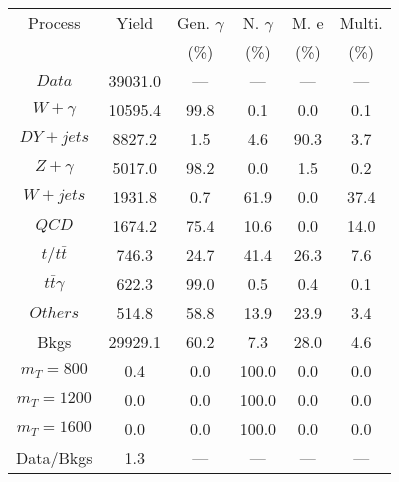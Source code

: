 \begin{figure}
\begin{minipage}[c]{0.32\textwidth}
{\begin{tabular}{cccccc}
\hline
Process & Yield & Gen. $\gamma$ & N. $\gamma$ & M. e & Multi. \\
 &  & (\%) & (\%) & (\%) & (\%)  \\
\hline
                                                                      $ Data $ &  39031.0 &  --- &  --- &  --- &  ---\\
$ W+\gamma $ &  10595.4 &  99.8 &  0.1 &  0.0 &  0.1\\
$ DY+jets $ &  8827.2 &  1.5 &  4.6 &  90.3 &  3.7\\
$ Z+\gamma $ &  5017.0 &  98.2 &  0.0 &  1.5 &  0.2\\
$ W+jets $ &  1931.8 &  0.7 &  61.9 &  0.0 &  37.4\\
$ QCD $ &  1674.2 &  75.4 &  10.6 &  0.0 &  14.0\\
$ t/t\bar{t} $ &  746.3 &  24.7 &  41.4 &  26.3 &  7.6\\
$ t\bar{t}\gamma $ &  622.3 &  99.0 &  0.5 &  0.4 &  0.1\\
$ Others $ &  514.8 &  58.8 &  13.9 &  23.9 &  3.4\\
Bkgs &  29929.1 &  60.2 &  7.3 &  28.0 &  4.6\\
$ m_{T} = 800 $ &  0.4 &  0.0 &  100.0 &  0.0 &  0.0\\
$ m_{T} = 1200 $ &  0.0 &  0.0 &  100.0 &  0.0 &  0.0\\
$ m_{T} = 1600 $ &  0.0 &  0.0 &  100.0 &  0.0 &  0.0\\
Data/Bkgs &  1.3 &  --- &  --- &  --- &  ---\\
\hline
\end{tabular}
}
\end{minipage}
\end{figure}

